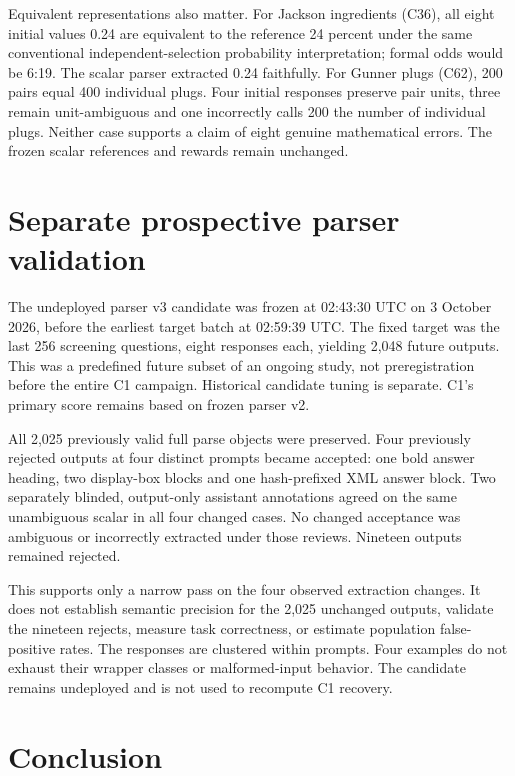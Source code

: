 \documentclass[11pt,a4paper]{article}
\begin{document}
Equivalent representations also matter. For Jackson ingredients (C36),
all eight initial values 0.24 are equivalent to the reference 24 percent
under the same conventional independent-selection probability
interpretation; formal odds would be 6:19. The scalar parser extracted
0.24 faithfully. For Gunner plugs (C62), 200 pairs equal 400 individual
plugs. Four initial responses preserve pair units, three remain
unit-ambiguous and one incorrectly calls 200 the number of individual
plugs. Neither case supports a claim of eight genuine mathematical
errors. The frozen scalar references and rewards remain unchanged.

\section{Separate prospective parser
validation}\label{separate-prospective-parser-validation}

The undeployed parser v3 candidate was frozen at 02:43:30 UTC on 3
October 2026, before the earliest target batch at 02:59:39 UTC. The
fixed target was the last 256 screening questions, eight responses each,
yielding 2,048 future outputs. This was a predefined future subset of an
ongoing study, not preregistration before the entire C1 campaign.
Historical candidate tuning is separate. C1's primary score remains
based on frozen parser v2.

All 2,025 previously valid full parse objects were preserved. Four
previously rejected outputs at four distinct prompts became accepted:
one bold answer heading, two display-box blocks and one hash-prefixed
XML answer block. Two separately blinded, output-only assistant
annotations agreed on the same unambiguous scalar in all four changed
cases. No changed acceptance was ambiguous or incorrectly extracted
under those reviews. Nineteen outputs remained rejected.

This supports only a narrow pass on the four observed extraction
changes. It does not establish semantic precision for the 2,025
unchanged outputs, validate the nineteen rejects, measure task
correctness, or estimate population false-positive rates. The responses
are clustered within prompts. Four examples do not exhaust their wrapper
classes or malformed-input behavior. The candidate remains undeployed
and is not used to recompute C1 recovery.

\section{Conclusion}\label{conclusion}
\end{document}
